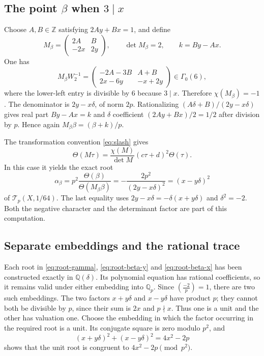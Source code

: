 \documentclass[11pt,a4paper]{article}
\theoremstyle{remark}
\newcommand{\Z}{\mathbb Z}\newcommand{\Q}{\mathbb Q}
\newcommand{\Tp}{\mathcal T_p}
\newcommand{\leg}[2]{\left(\frac{#1}{#2}\right)}
\newcommand{\smat}[4]{\begin{pmatrix}#1&#2\\#3&#4\end{pmatrix}}
\begin{document}
\subsection{The point \texorpdfstring{$\beta$}{beta} when
\texorpdfstring{$3\mid x$}{3 divides x}}
Choose $A,B\in\Z$ satisfying $2Ay+Bx=1$, and define
\begin{equation}\label{eq:M-beta-x}
 M_\beta=\smat{2A}B{-2x}{2y},\qquad \det M_\beta=2,
 \qquad k=By-Ax.
\end{equation}
One has
\[
 M_\beta W_2^{-1}
 =\smat{-2A-3B}{A+B}{2x-6y}{-x+2y}\in\Gamma_0(6),
\]
where the lower-left entry is divisible by $6$ because $3\mid x$.
Therefore $\chi(M_\beta)=-1$.
The denominator is $2y-x\delta$, of norm $2p$.
Rationalizing $(A\delta+B)/(2y-x\delta)$ gives real part
$By-Ax=k$ and $\delta$ coefficient $(2Ay+Bx)/2=1/2$ after
division by $p$. Hence again $M_\beta\beta=(\beta+k)/p$.

The transformation convention \eqref{eq:slash} gives
\[
 \Theta(M\tau)=\frac{\chi(M)}{\det M}(c\tau+d)^2\Theta(\tau).
\]
In this case it yields the exact root
\begin{equation}\label{eq:root-beta-x}
 \alpha_\beta=p^2\frac{\Theta(\beta)}{\Theta(M_\beta\beta)}
 =-\frac{2p^2}{(2y-x\delta)^2}=(x-y\delta)^2
\end{equation}
of $\Tp(X,1/64)$.
The last equality uses $2y-x\delta=-\delta(x+y\delta)$ and
$\delta^2=-2$. Both the negative character and the determinant
factor are part of this computation.

\subsection{Separate embeddings and the rational trace}
Each root in \eqref{eq:root-gamma}, \eqref{eq:root-beta-y} and
\eqref{eq:root-beta-x} has been constructed exactly in $\Q(\delta)$.
Its polynomial equation has rational coefficients, so it remains
valid under either embedding into $\Q_p$.
Since $\leg{-2}p=1$, there are two such embeddings.
The two factors $x+y\delta$ and $x-y\delta$ have product $p$;
they cannot both be divisible by $p$, since their sum is $2x$
and $p\nmid x$. Thus one is a unit and the other has valuation one.
Choose the embedding in which the factor occurring in the required
root is a unit. Its conjugate square is zero modulo $p^2$, and
\begin{equation}\label{eq:CM-trace}
 (x+y\delta)^2+(x-y\delta)^2=4x^2-2p
\end{equation}
shows that the unit root is congruent to $4x^2-2p\pmod{p^2}$.
\end{document}
